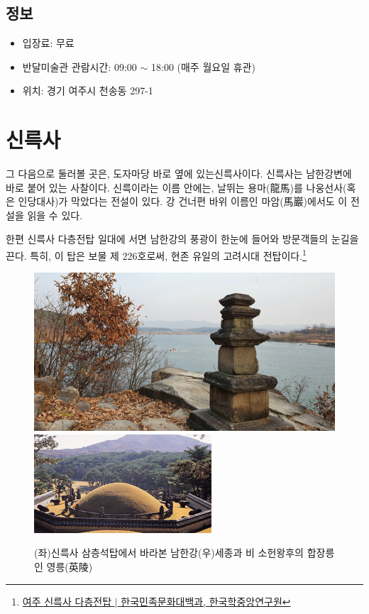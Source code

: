 \documentclass[chapter, oneside]{oblivoir}
\begin{document}
\subsection{정보}

\begin{itemize}
\item 입장료: 무료
\item 반달미술관 관람시간: 09:00 $\sim$ 18:00 (매주 월요일 휴관)
\item 위치: 경기 여주시 천송동 297-1
\end{itemize}

\section{신륵사}
그 다음으로 둘러볼 곳은, 도자마당 바로 옆에 있는신륵사이다. 신륵사는 남한강변에 바로 붙어 있는 사찰이다. 
신륵이라는 이름 안에는, 날뛰는 용마(龍馬)를 나웅선사(혹은 인당대사)가 막았다는 전설이 있다.
강 건너편 바위 이름인 마암(馬巖)에서도 이 전설을 읽을 수 있다.


한편 신륵사 다층전탑 일대에 서면 남한강의 풍광이 한눈에 들어와 방문객들의 눈길을 끈다. 
특히, 이 탑은 보물 제 226호로써, 현존 유일의 고려시대 전탑이다.\footnote{
 \href{https://terms.naver.com/entry.naver?docId=560144&cid=46656&categoryId=46656}{여주 신륵사 다층전탑 $|$ 한국민족문화대백과, 한국학중앙연구원}
 } 

 
 \begin{figure}
    \centering
    \includegraphics[width=.45\textwidth]{img/신륵사 삼층석탑.jpg}
    \includegraphics[width=.45\textwidth]{img/영릉.jpg}
    \caption{(좌)신륵사 삼층석탑에서 바라본 남한강\protect\footnotemark  (우)세종과 비 소헌왕후의 합장릉인 영릉(英陵)\protect\footnotemark}
    \label{fig:my_labe5}
\end{figure}
\end{document}
